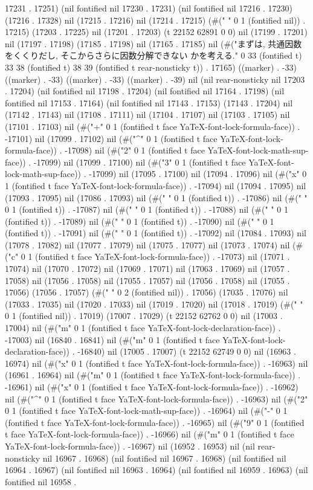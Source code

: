 17231 . 17251) (nil fontified nil 17230 . 17231) (nil fontified nil 17216 . 17230) (17216 . 17328) nil (17215 . 17216) nil (17214 . 17215) (#(" " 0 1 (fontified nil)) . 17215) (17203 . 17225) nil (17201 . 17203) (t 22152 62891 0 0) nil (17199 . 17201) nil (17197 . 17198) (17185 . 17198) nil (17165 . 17185) nil (#("まずは, 共通因数をくくりだし, そこからさらに因数分解できない
かを考える." 0 33 (fontified t) 33 38 (fontified t) 38 39 (fontified t rear-nonsticky t)) . 17165) ((marker) . -33) ((marker) . -33) ((marker) . -33) ((marker) . -39) nil (nil rear-nonsticky nil 17203 . 17204) (nil fontified nil 17198 . 17204) (nil fontified nil 17164 . 17198) (nil fontified nil 17153 . 17164) (nil fontified nil 17143 . 17153) (17143 . 17204) nil (17142 . 17143) nil (17108 . 17111) nil (17104 . 17107) nil (17103 . 17105) nil (17101 . 17103) nil (#("+" 0 1 (fontified t face YaTeX-font-lock-formula-face)) . -17101) nil (17099 . 17102) nil (#("^" 0 1 (fontified t face YaTeX-font-lock-formula-face)) . -17098) nil (#("2" 0 1 (fontified t face YaTeX-font-lock-math-sup-face)) . -17099) nil (17099 . 17100) nil (#("3" 0 1 (fontified t face YaTeX-font-lock-math-sup-face)) . -17099) nil (17095 . 17100) nil (17094 . 17096) nil (#("x" 0 1 (fontified t face YaTeX-font-lock-formula-face)) . -17094) nil (17094 . 17095) nil (17093 . 17095) nil (17086 . 17093) nil (#(" " 0 1 (fontified t)) . -17086) nil (#(" " 0 1 (fontified t)) . -17087) nil (#(" " 0 1 (fontified t)) . -17088) nil (#(" " 0 1 (fontified t)) . -17089) nil (#(" " 0 1 (fontified t)) . -17090) nil (#(" " 0 1 (fontified t)) . -17091) nil (#(" " 0 1 (fontified t)) . -17092) nil (17084 . 17093) nil (17078 . 17082) nil (17077 . 17079) nil (17075 . 17077) nil (17073 . 17074) nil (#("c" 0 1 (fontified t face YaTeX-font-lock-formula-face)) . -17073) nil (17071 . 17074) nil (17070 . 17072) nil (17069 . 17071) nil (17063 . 17069) nil (17057 . 17058) nil (17056 . 17058) nil (17055 . 17057) nil (17056 . 17058) nil (17055 . 17056) (17056 . 17057) (#("  " 0 2 (fontified nil)) . 17056) (17035 . 17076) nil (17033 . 17035) nil (17020 . 17033) nil (17019 . 17020) nil (17018 . 17019) (#(" " 0 1 (fontified nil)) . 17019) (17007 . 17029) (t 22152 62762 0 0) nil (17003 . 17004) nil (#("m" 0 1 (fontified t face YaTeX-font-lock-declaration-face)) . -17003) nil (16840 . 16841) nil (#("m" 0 1 (fontified t face YaTeX-font-lock-declaration-face)) . -16840) nil (17005 . 17007) (t 22152 62749 0 0) nil (16963 . 16974) nil (#("x" 0 1 (fontified t face YaTeX-font-lock-formula-face)) . -16963) nil (16961 . 16964) nil (#("m" 0 1 (fontified t face YaTeX-font-lock-formula-face)) . -16961) nil (#("x" 0 1 (fontified t face YaTeX-font-lock-formula-face)) . -16962) nil (#("^" 0 1 (fontified t face YaTeX-font-lock-formula-face)) . -16963) nil (#("2" 0 1 (fontified t face YaTeX-font-lock-math-sup-face)) . -16964) nil (#("-" 0 1 (fontified t face YaTeX-font-lock-formula-face)) . -16965) nil (#("9" 0 1 (fontified t face YaTeX-font-lock-formula-face)) . -16966) nil (#("m" 0 1 (fontified t face YaTeX-font-lock-formula-face)) . -16967) nil (16952 . 16953) nil (nil rear-nonsticky nil 16967 . 16968) (nil fontified nil 16967 . 16968) (nil fontified nil 16964 . 16967) (nil fontified nil 16963 . 16964) (nil fontified nil 16959 . 16963) (nil fontified nil 16958 . 